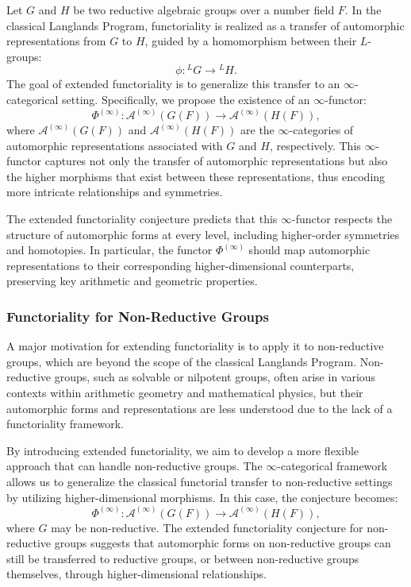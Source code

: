 \documentclass{article}
\theoremstyle{remark}
\begin{document}
Let $G$ and $H$ be two reductive algebraic groups over a number field $F$. In the classical Langlands Program, functoriality is realized as a transfer of automorphic representations from $G$ to $H$, guided by a homomorphism between their $L$-groups:
\[
\phi: {}^L G \to {}^L H.
\]
The goal of extended functoriality is to generalize this transfer to an $\infty$-categorical setting. Specifically, we propose the existence of an $\infty$-functor:
\[
\Phi^{(\infty)}: \mathcal{A}^{(\infty)}(G(F)) \to \mathcal{A}^{(\infty)}(H(F)),
\]
where $\mathcal{A}^{(\infty)}(G(F))$ and $\mathcal{A}^{(\infty)}(H(F))$ are the $\infty$-categories of automorphic representations associated with $G$ and $H$, respectively. This $\infty$-functor captures not only the transfer of automorphic representations but also the higher morphisms that exist between these representations, thus encoding more intricate relationships and symmetries.

The extended functoriality conjecture predicts that this $\infty$-functor respects the structure of automorphic forms at every level, including higher-order symmetries and homotopies. In particular, the functor $\Phi^{(\infty)}$ should map automorphic representations to their corresponding higher-dimensional counterparts, preserving key arithmetic and geometric properties.

\subsubsection{Functoriality for Non-Reductive Groups}

A major motivation for extending functoriality is to apply it to non-reductive groups, which are beyond the scope of the classical Langlands Program. Non-reductive groups, such as solvable or nilpotent groups, often arise in various contexts within arithmetic geometry and mathematical physics, but their automorphic forms and representations are less understood due to the lack of a functoriality framework.

By introducing extended functoriality, we aim to develop a more flexible approach that can handle non-reductive groups. The $\infty$-categorical framework allows us to generalize the classical functorial transfer to non-reductive settings by utilizing higher-dimensional morphisms. In this case, the conjecture becomes:
\[
\Phi^{(\infty)}: \mathcal{A}^{(\infty)}(G(F)) \to \mathcal{A}^{(\infty)}(H(F)),
\]
where $G$ may be non-reductive. The extended functoriality conjecture for non-reductive groups suggests that automorphic forms on non-reductive groups can still be transferred to reductive groups, or between non-reductive groups themselves, through higher-dimensional relationships.
\end{document}
